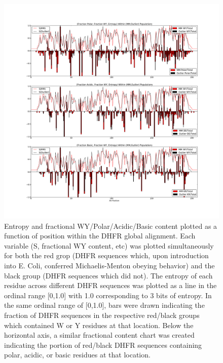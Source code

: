 \documentclass[a4paper,11pt]{article}
\begin{document}
\listoffigures


\begin{figure}[h]
\centerline{\includegraphics[width=8in]{AA+S.pdf}}
\caption[$S_{\rm red}$, $S_{\rm black}$, WY/Polar/Acidic/Basic Content vs Residue \#]{Entropy and fractional WY/Polar/Acidic/Basic content plotted as a function of position within the DHFR global alignment. Each variable (S, fractional WY content, etc) was plotted simultaneously for both the red grop (DHFR sequences which, upon introduction into E. Coli, conferred Michaelis-Menton obeying behavior) and the black group (DHFR sequences which did not). The entropy of each residue across different DHFR sequences was plotted as a line in the ordinal range [0,1.0] with 1.0 corresponding to 3 bits of entropy. In the same ordinal range of [0,1.0], bars were drawn indicating the fraction of DHFR sequences in the respective red/black groups which contained W or Y residues at that location. Below the horizontal axis, a similar fractional content chart was created indicating the portion of red/black DHFR sequences containing polar, acidic, or basic residues at that location.}
\end{figure}
\end{document}

